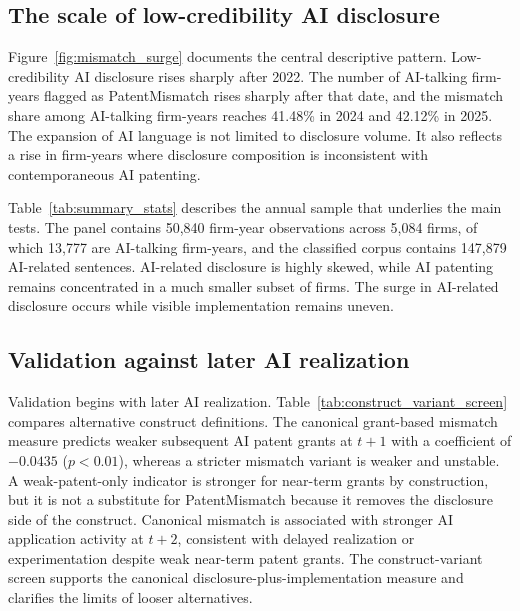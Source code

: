 \subsection{The scale of low-credibility AI disclosure}

Figure~\ref{fig:mismatch_surge} documents the central descriptive pattern. Low-credibility AI disclosure rises sharply after 2022. The number of AI-talking firm-years flagged as PatentMismatch rises sharply after that date, and the mismatch share among AI-talking firm-years reaches 41.48\% in 2024 and 42.12\% in 2025. The expansion of AI language is not limited to disclosure volume. It also reflects a rise in firm-years where disclosure composition is inconsistent with contemporaneous AI patenting.

Table~\ref{tab:summary_stats} describes the annual sample that underlies the main tests. The panel contains 50,840 firm-year observations across 5,084 firms, of which 13,777 are AI-talking firm-years, and the classified corpus contains 147,879 AI-related sentences. AI-related disclosure is highly skewed, while AI patenting remains concentrated in a much smaller subset of firms. The surge in AI-related disclosure occurs while visible implementation remains uneven.



\subsection{Validation against later AI realization}

 Validation begins with later AI realization. Table~\ref{tab:construct_variant_screen} compares alternative construct definitions. The canonical grant-based mismatch measure predicts weaker subsequent AI patent grants at $t+1$ with a coefficient of $-0.0435$ ($p<0.01$), whereas a stricter mismatch variant is weaker and unstable. A weak-patent-only indicator is stronger for near-term grants by construction, but it is not a substitute for PatentMismatch because it removes the disclosure side of the construct. Canonical mismatch is associated with stronger AI application activity at $t+2$, consistent with delayed realization or experimentation despite weak near-term patent grants. The construct-variant screen supports the canonical disclosure-plus-implementation measure and clarifies the limits of looser alternatives.



